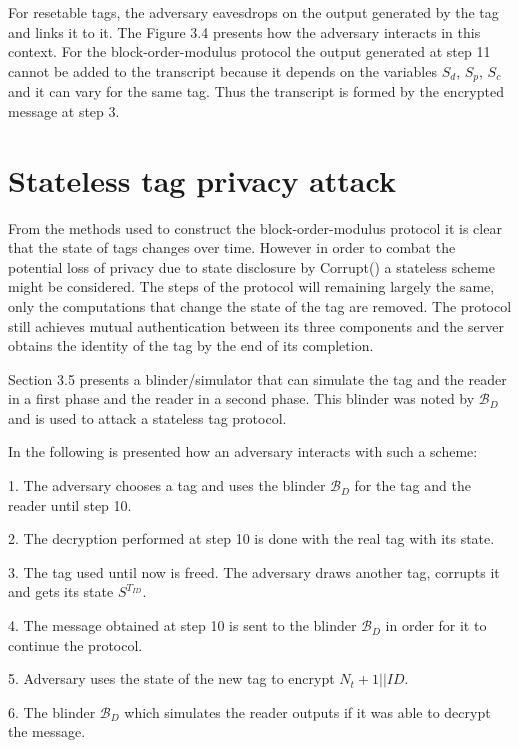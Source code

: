     For resetable tags, the adversary eavesdrops on the output generated by the tag and links it to it. The Figure 3.4 presents how the adversary
    interacts in this context. For the block-order-modulus protocol the output generated at step 11 cannot be added to the transcript because it
    depends on the variables $S_d$, $S_p$, $S_c$ and it can vary for the same tag. Thus the transcript is formed by the encrypted message at step 3.
    
\section{Stateless tag privacy attack}
    From the methods used to construct the block-order-modulus protocol it is clear that the state of tags changes over time. However in order to combat
    the potential loss of privacy due to state disclosure by Corrupt() a stateless scheme might be considered. The steps of the protocol will remaining
    largely the same, only the computations that change the state of the tag are removed. The protocol still achieves mutual authentication between its 
    three components and the server obtains the identity of the tag by the end of its completion. 
    
    Section 3.5 presents a blinder/simulator
    that can simulate the tag and the reader in a first phase and the reader in a second phase. This blinder was noted by $\mathcal{B}_D$ and is used
    to attack a stateless tag protocol.
    
    In the following is presented how an adversary interacts with such a scheme:

    1. The adversary chooses a tag and uses the blinder $\mathcal{B}_D$ for the tag and the reader until step 10.

    2. The decryption performed at step 10 is done with the real tag with its state. 

    3. The tag used until now is freed. The adversary draws another tag, corrupts it and gets its state $S^{T_{ID}}$.

    4. The message obtained at step 10 is sent to the blinder $\mathcal{B}_D$ in order for it to continue the protocol.

    5. Adversary uses the state of the new tag to encrypt $N_t+1||ID$.

    6. The blinder $\mathcal{B}_D$ which simulates the reader outputs if it was able to decrypt the message.


